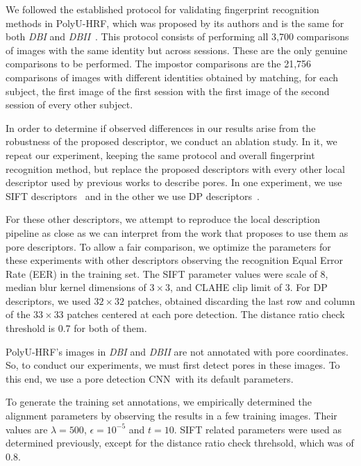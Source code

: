 \documentclass[10pt,twocolumn,letterpaper]{article}
\begin{document}
We followed the established protocol for validating fingerprint recognition methods in PolyU-HRF, which was proposed by its authors and is the same for both \textit{DBI} and \textit{DBII}~\cite{direct-pore}.
This protocol consists of performing all 3,700 comparisons of images with the same identity but across sessions.
These are the only genuine comparisons to be performed.
The impostor comparisons are the 21,756 comparisons of images with different identities obtained by matching, for each subject, the first image of the first session with the first image of the second session of every other subject.

In order to determine if observed differences in our results arise from the robustness of the proposed descriptor, we conduct an ablation study.
In it, we repeat our experiment, keeping the same protocol and overall fingerprint recognition method, but replace the proposed descriptors with every other local descriptor used by previous works to describe pores.
In one experiment, we use SIFT descriptors~\cite{ridge-reconstruction} and in the other we use DP descriptors~\cite{direct-pore, td-sparse, feature-guided}.

For these other descriptors, we attempt to reproduce the local description pipeline as close as we can interpret from the work that proposes to use them as pore descriptors.
To allow a fair comparison, we optimize the parameters for these experiments with other descriptors observing the recognition Equal Error Rate (EER) in the training set.
The SIFT parameter values were scale of 8, median blur kernel dimensions of ${3 \times 3}$, and CLAHE clip limit of 3.
For DP descriptors, we used ${32 \times 32}$ patches, obtained discarding the last row and column of the ${33 \times 33}$ patches centered at each pore detection.
The distance ratio check threshold is 0.7 for both of them.

PolyU-HRF's images in \textit{DBI} and \textit{DBII} are not annotated with pore coordinates.
So, to conduct our experiments, we must first detect pores in these images.
To this end, we use a pore detection CNN\ifcvprfinal~\cite{fcn-pore-det}\else\cite{supp-fcn-pore-det}\fi with its default parameters. 

To generate the training set annotations, we empirically determined the alignment parameters by observing the results in a few training images.
Their values are ${\lambda = 500}$, ${\epsilon = 10^{-5}}$ and ${t = 10}$.
SIFT related parameters were used as determined previously, except for the distance ratio check threhsold, which was of 0.8.
\end{document}
